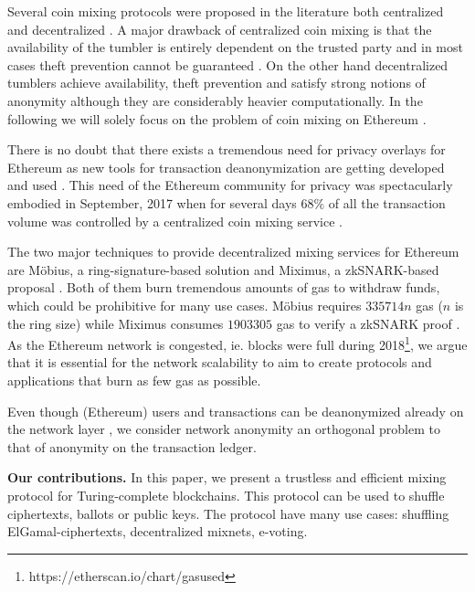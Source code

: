 \documentclass[a4paper]{article}
\theoremstyle{definition}
\begin{document}
Several coin mixing protocols were proposed in the literature both centralized \cite{bonneau2014mixcoin,valenta2015blindcoin,heilman2017tumblebit} and decentralized \cite{maxwell2013coinjoin,ruffing2014coinshuffle,miximus2018,meiklejohn2018mobius,bissias2014sybil}. A major drawback of centralized coin mixing is that the availability of the tumbler is entirely dependent on the trusted party and in most cases theft prevention cannot be guaranteed \cite{bonneau2014mixcoin,valenta2015blindcoin}. On the other hand decentralized tumblers achieve availability, theft prevention and satisfy strong notions of anonymity although they are considerably heavier computationally. In the following we will solely focus on the problem of coin mixing on Ethereum \cite{wood2014ethereum}. 

There is no doubt that there exists a tremendous need for privacy overlays for Ethereum as new tools for transaction deanonymization are getting developed and used \cite{chan2017ethereum}. This need of the Ethereum community for privacy was spectacularly embodied in September, 2017 when for several days $68\%$ of all the transaction volume was controlled by a centralized coin mixing service \cite{hugemixer2017}.

The two major techniques to provide decentralized mixing services for Ethereum are Möbius, a ring-signature-based solution \cite{meiklejohn2018mobius} and Miximus, a zkSNARK-based proposal \cite{miximus2018}. Both of them burn tremendous amounts of gas to withdraw funds, which could be prohibitive for many use cases. Möbius requires $\num[group-separator={,}]{335714}n$ gas ($n$ is the ring size) while Miximus consumes $\num[group-separator={,}]{1903305}$ gas to verify a zkSNARK proof \cite{miximus2018gascost}. As the Ethereum network is congested, ie. blocks were full during 2018\footnote{https://etherscan.io/chart/gasused}, we argue that it is essential for the network scalability to aim to create protocols and applications that burn as few gas as possible. 

Even though (Ethereum) users and transactions can be deanonymized already on the network layer \cite{ethmacrofag2016}, we consider network anonymity an orthogonal problem to that of anonymity on the transaction ledger.    

\textbf{Our contributions.} In this paper, we present a trustless and efficient mixing protocol for Turing-complete blockchains. This protocol can be used to shuffle ciphertexts, ballots or public keys. The protocol have many use cases: shuffling ElGamal-ciphertexts, decentralized mixnets, e-voting.
\end{document}
